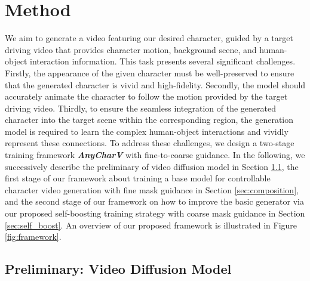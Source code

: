 




\section{Method}

We aim to generate a video featuring our desired character, guided by a target driving video that provides character motion, background scene, and human-object interaction information. This task presents several significant challenges.
Firstly, the appearance of the given character must be well-preserved to ensure that the generated character is vivid and high-fidelity. Secondly, the model should accurately animate the character to follow the motion provided by the target driving video. Thirdly, to ensure the seamless integration of the generated character into the target scene within the corresponding region, the generation model is required to learn the complex human-object interactions and vividly represent these connections.
To address these challenges, we design a two-stage training framework \textbf{\textit{AnyCharV}} with fine-to-coarse guidance.
In the following, we successively describe the preliminary of video diffusion model in Section \ref{sec:preliminary}, the first stage of our framework about training a base model for controllable character video generation with fine mask guidance in Section \ref{sec:composition}, and the second stage of our framework on how to improve the basic generator via our proposed self-boosting training strategy with coarse mask guidance in Section \ref{sec:self_boost}.
An overview of our proposed framework is illustrated in Figure \ref{fig:framework}.


\subsection{Preliminary: Video Diffusion Model}
\label{sec:preliminary}


